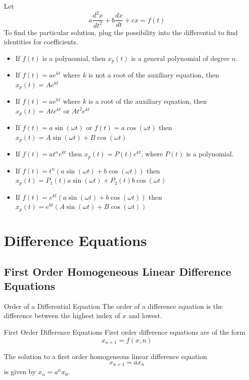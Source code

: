 \documentclass[a4paper]{article}
\begin{document}
\begin{thm}{}{} Let $$a\frac{d^2x}{dt^2}+b\frac{dx}{dt}+cx=f(t)$$ To find the particular solution, plug the possibility into the differential to find identities for coefficients. 
\begin{itemize}
\item If $f(t)$ is a polynomial, then $x_p(t)$ is a general polynomial of degree $n$. 
\item If $f(t)=ae^{kt}$ where $k$ is not a root of the auxiliary equation, then $x_p(t)=Ae^{kt}$
\item If $f(t)=ae^{kt}$ where $k$ is a root of the auxiliary equation, then $x_p(t)=Ate^{kt}$ or $At^2e^{kt}$
\item If $f(t)=a\sin(\omega t)$ or $f(t)=a\cos(\omega t)$ then $x_p(t)=A\sin(\omega t)+B\cos(\omega t)$
\item If $f(t)=at^ne^{kt}$ then $x_p(t)=P(t)e^{kt}$, where $P(t)$ is a polynomial. 
\item If $f(t)=t^n(a\sin(\omega t)+b\cos(\omega t))$ then $x_p(t)=P_1(t)a\sin(\omega t)+P_2(t)b\cos(\omega t)$
\item If $f(t)=e^{kt}(a\sin(\omega t)+b\cos(\omega t))$ then $x_p(t)=e^{kt}(A\sin(\omega t)+B\cos(\omega t))$
\end{itemize}
\end{thm}

\pagebreak
\section{Difference Equations}
\subsection{First Order Homogeneous Linear Difference Equations}
\begin{defn}{Order of a Differential Equation}{} The order of a difference equation is the difference between the highest index of $x$ and lowest. 
\end{defn}

\begin{defn}{First Order Difference Equations}{} First order difference equations are of the form $$x_{n+1}=f(x,n)$$
\end{defn}

\begin{thm}{}{} The solution to a first order homogeneous linear difference equation $$x_{n+1}=ax_n$$ is given by $x_n=a^nx_0$. 
\end{thm}
\end{document}
